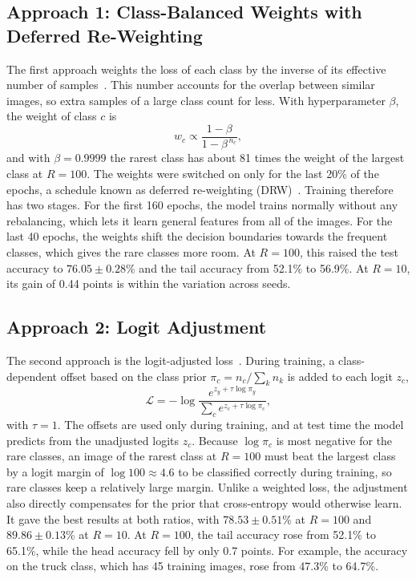 \documentclass[11pt,a4paper]{article}
\newcommand{\pct}[1]{#1\%}
\newcommand{\pmpct}[2]{$#1 \pm #2$\%}
\begin{document}
\subsection*{Approach 1: Class-Balanced Weights with Deferred Re-Weighting}

The first approach weights the loss of each class by the inverse of its effective number of samples~\cite{cui2019classbalanced}. This number accounts for the overlap between similar images, so extra samples of a large class count for less. With hyperparameter $\beta$, the weight of class $c$ is
\begin{equation}
  w_c \propto \frac{1-\beta}{1-\beta^{\,n_c}},
  \label{eq:cb}
\end{equation}
and with $\beta = 0.9999$ the rarest class has about 81 times the weight of the largest class at $R = 100$. The weights were switched on only for the last \pct{20} of the epochs, a schedule known as deferred re-weighting (DRW)~\cite{cao2019ldam}. Training therefore has two stages. For the first 160 epochs, the model trains normally without any rebalancing, which lets it learn general features from all of the images. For the last 40 epochs, the weights shift the decision boundaries towards the frequent classes, which gives the rare classes more room. At $R = 100$, this raised the test accuracy to \pmpct{76.05}{0.28} and the tail accuracy from \pct{52.1} to \pct{56.9}. At $R = 10$, its gain of 0.44 points is within the variation across seeds.

\subsection*{Approach 2: Logit Adjustment}

The second approach is the logit-adjusted loss~\cite{menon2021logitadjustment}. During training, a class-dependent offset based on the class prior $\pi_c = n_c / \sum_k n_k$ is added to each logit $z_c$,
\begin{equation}
  \mathcal{L} = -\log \frac{e^{z_y + \tau \log \pi_y}}{\sum_{c} e^{z_c + \tau \log \pi_c}},
  \label{eq:la}
\end{equation}
with $\tau = 1$. The offsets are used only during training, and at test time the model predicts from the unadjusted logits $z_c$. Because $\log \pi_c$ is most negative for the rare classes, an image of the rarest class at $R = 100$ must beat the largest class by a logit margin of $\log 100 \approx 4.6$ to be classified correctly during training, so rare classes keep a relatively large margin. Unlike a weighted loss, the adjustment also directly compensates for the prior that cross-entropy would otherwise learn. It gave the best results at both ratios, with \pmpct{78.53}{0.51} at $R = 100$ and \pmpct{89.86}{0.13} at $R = 10$. At $R = 100$, the tail accuracy rose from \pct{52.1} to \pct{65.1}, while the head accuracy fell by only 0.7 points. For example, the accuracy on the truck class, which has 45 training images, rose from \pct{47.3} to \pct{64.7}.
\end{document}

